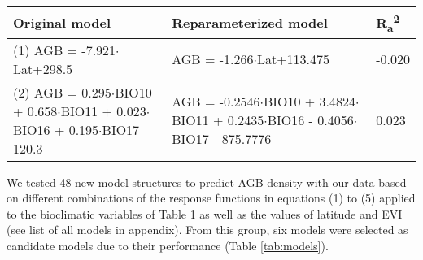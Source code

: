 \documentclass[review, authoryear]{elsarticle}   	%
\DeclareRobustCommand{\Jhoa}{\todo[author=Jhoa, inline, color=yellow!40, size=\small]}
\begin{document}
\begin{table}[htbp]
   \centering
  
   \begin{tabular}{p{6.5cm}p{6.5cm}p{1.5cm}}  %
      \toprule
       Original model   & Reparameterized model & R\textsubscript{a}\textsuperscript{2}\\
      \midrule
       (1) AGB = -7.921$\cdot$Lat+298.5 & AGB = -1.266$\cdot$Lat+113.475   & -0.020\\
       (2) AGB = 0.295$\cdot$BIO10 + 0.658$\cdot$BIO11 + 0.023$\cdot$BIO16 + 0.195$\cdot$BIO17 - 120.3 & AGB = -0.2546$\cdot$BIO10 + 3.4824$\cdot$BIO11 + 0.2435$\cdot$BIO16 - 0.4056$\cdot$BIO17 - 875.7776 & 0.023\\ 
        \bottomrule
   \end{tabular}
   \label{tab:globalModels}
\end{table}



We tested 48 new model structures to predict AGB density with our data based on different combinations of the response functions in equations (1) to (5) applied to the bioclimatic variables of Table 1 as well as the values of latitude and EVI (see list of all models in appendix). From this group, six models were selected as candidate models due to their performance (Table \ref{tab:models}). 
\end{document}
